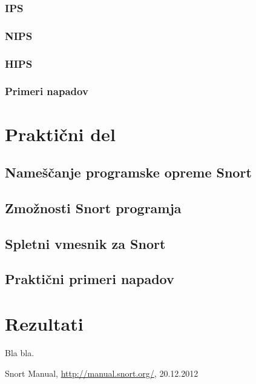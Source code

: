 \documentclass[12pt]{article}
\let\stdsection\section
\renewcommand\section{\newpage\stdsection}
\begin{document}
\subsubsection{IPS}
\subsubsection{NIPS}
\subsubsection{HIPS}
\subsubsection{Primeri napadov}


\section{Praktični del}

\subsection{Nameščanje programske opreme Snort}
\subsection{Zmožnosti Snort programja}
\subsection{Spletni vmesnik za Snort}
\subsection{Praktični primeri napadov}

\section{Rezultati}

Bla bla.

\clearpage
{}
\begin{thebibliography}{9}


Snort Manual, \url{http://manual.snort.org/}, 20.12.2012

\end{thebibliography}
\end{document}
